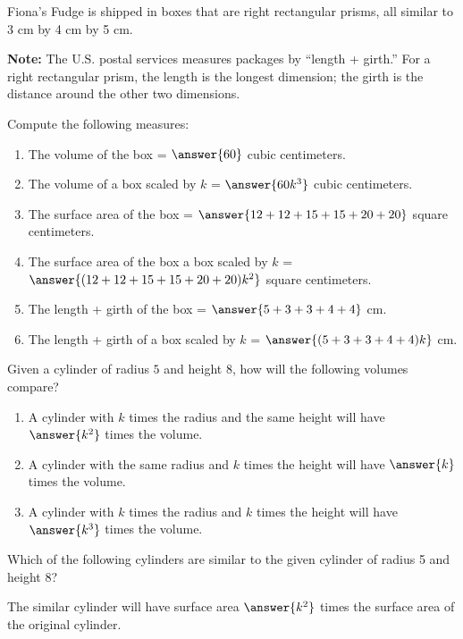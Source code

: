 \documentclass[nooutcomes]{ximera}
\begin{document}
\begin{question}
Fiona's Fudge is shipped in boxes that are right rectangular prisms, all similar to 3 cm by 4 cm by 5 cm.  

\textbf{Note:} The U.S. postal services measures packages by ``length + girth.''  For a right rectangular prism, the length is the longest dimension; the girth is the distance around the other two dimensions.  

Compute the following measures: 
\begin{enumerate}
\item The volume of the box = $\answer{60}$ cubic centimeters.
\item The volume of a box scaled by $k$ = $\answer{60k^3}$ cubic centimeters.
\item The surface area of the box = $\answer{12+12+15+15+20+20}$ square centimeters. 
\item The surface area of the box a box scaled by $k$ = $\answer{(12+12+15+15+20+20)k^2}$ square centimeters. 
\item The length + girth of the box = $\answer{5 + 3 + 3 + 4 + 4}$ cm.
\item The length + girth of a box scaled by $k$ = $\answer{(5 + 3 + 3 + 4 + 4)k}$ cm. 
\end{enumerate}
\end{question}

\begin{question}
Given a cylinder of radius $5$ and height $8$, how will the following volumes compare?  
\begin{enumerate}
\item A cylinder with $k$ times the radius and the same height will have  $\answer{k^2}$ times the volume.  
\item A cylinder with the same radius and $k$ times the height will have  $\answer{k}$ times the volume. 
\item A cylinder with $k$ times the radius and $k$ times the height will have  $\answer{k^3}$ times the volume. 
\end{enumerate}
\end{question}

\begin{question}
Which of the following cylinders are similar to the given cylinder of radius 5 and height 8?  
\begin{selectAll}
\end{selectAll}

The similar cylinder will have surface area $\answer{k^2}$ times the surface area of the original cylinder.  
\end{question}
\end{document}
